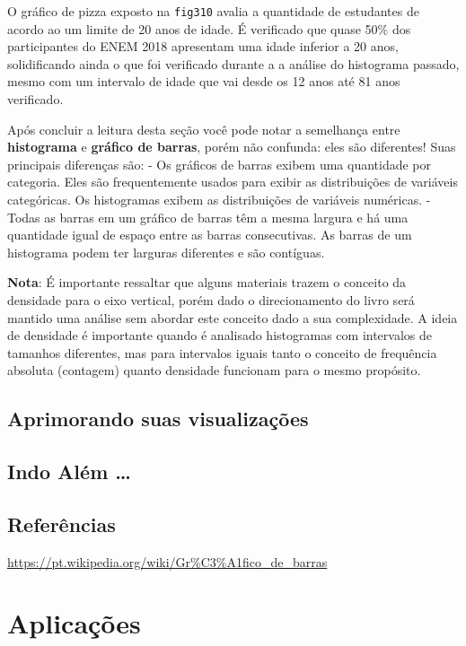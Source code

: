 \documentclass[
]{book}
\begin{document}
O gráfico de pizza exposto na \texttt{fig310} avalia a quantidade de estudantes de acordo ao um limite de 20 anos de idade. É verificado que quase 50\% dos participantes do ENEM 2018 apresentam uma idade inferior a 20 anos, solidificando ainda o que foi verificado durante a a análise do histograma passado, mesmo com um intervalo de idade que vai desde os 12 anos até 81 anos verificado.

Após concluir a leitura desta seção você pode notar a semelhança entre \textbf{histograma} e \textbf{gráfico de barras}, porém não confunda: eles são diferentes! Suas principais diferenças são:
- Os gráficos de barras exibem uma quantidade por categoria. Eles são frequentemente usados para exibir as distribuições de variáveis categóricas. Os histogramas exibem as distribuições de variáveis numéricas.
- Todas as barras em um gráfico de barras têm a mesma largura e há uma quantidade igual de espaço entre as barras consecutivas. As barras de um histograma podem ter larguras diferentes e são contíguas.

\textbf{Nota}: É importante ressaltar que alguns materiais trazem o conceito da densidade para o eixo vertical, porém dado o direcionamento do livro será mantido uma análise sem abordar este conceito dado a sua complexidade. A ideia de densidade é importante quando é analisado histogramas com intervalos de tamanhos diferentes, mas para intervalos iguais tanto o conceito de frequência absoluta (contagem) quanto densidade funcionam para o mesmo propósito.

\hypertarget{aprimorando-suas-visualizauxe7uxf5es}{%
\section{Aprimorando suas visualizações}\label{aprimorando-suas-visualizauxe7uxf5es}}

\hypertarget{indo-aluxe9m}{%
\section{Indo Além \ldots{}}\label{indo-aluxe9m}}

\hypertarget{referuxeancias}{%
\section{Referências}\label{referuxeancias}}

\url{https://pt.wikipedia.org/wiki/Gr\%C3\%A1fico_de_barras}

\hypertarget{aplicauxe7uxf5es}{%
\chapter{Aplicações}\label{aplicauxe7uxf5es}}
\end{document}
